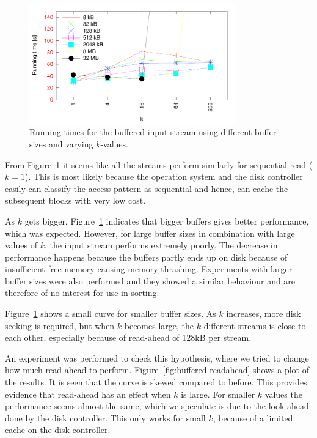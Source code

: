 \documentclass[a4paper,12pt]{article}
\begin{document}
\begin{figure}[h!]
  \centering
  \includegraphics[width=0.8\textwidth]{buffered_input}
  \caption{Running times for the buffered input stream using different
    buffer sizes and varying $k$-values.}
  \label{fig:buffered-input}
\end{figure}

From Figure~\ref{fig:buffered-input} it seems like all the streams
perform similarly for sequential read ($k = 1$). This is most likely because the operation system and the disk controller easily can classify the access pattern as sequential and hence, can cache the subsequent blocks with very low cost.

As $k$ gets bigger, Figure~\ref{fig:buffered-input} indicates that
bigger buffers gives better performance, which was expected. However,
for large buffer sizes in combination with large values of $k$, the
input stream performs extremely poorly. The decrease in performance happens because the
buffers partly ends up on disk because of insufficient free memory causing memory thrashing. Experiments with larger buffer sizes were also performed and they
showed a similar behaviour and are therefore of no
interest for use in sorting.


Figure~\ref{fig:buffered-input} shows a small curve for smaller buffer
sizes. As $k$ increases, more disk seeking is required, but when $k$
becomes large, the $k$ different streams is close to each other,
especially because of read-ahead of 128kB per stream.

An experiment was performed to check this hypothesis, where we tried
to change how much read-ahead to
perform. Figure~\ref{fig:buffered-readahead} shows a plot of the
results. It is seen that the curve is skewed compared to before. This
provides evidence that read-ahead has an effect when $k$ is large. For
smaller $k$ values the performance seems almost the same, which we
speculate is due to the look-ahead done by the disk controller. This
only works for small $k$, because of a limited cache on the disk
controller.
\end{document}
